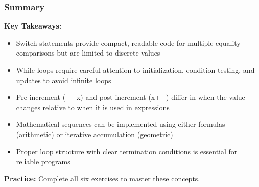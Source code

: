 \documentclass{beamer}
\begin{document}
\begin{frame}
\frametitle{Summary}
\textbf{Key Takeaways:}
\begin{itemize}
\item Switch statements provide compact, readable code for multiple equality comparisons but are limited to discrete values
\pause
\item While loops require careful attention to initialization, condition testing, and updates to avoid infinite loops
\pause
\item Pre-increment (++x) and post-increment (x++) differ in when the value changes relative to when it is used in expressions
\pause
\item Mathematical sequences can be implemented using either formulas (arithmetic) or iterative accumulation (geometric)
\pause
\item Proper loop structure with clear termination conditions is essential for reliable programs
\end{itemize}

\pause
\textbf{Practice:} Complete all six exercises to master these concepts.
\end{frame}
\end{document}
